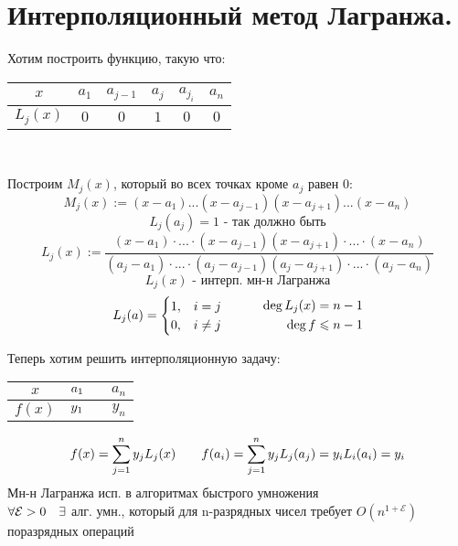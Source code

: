 \documentclass[algebra]{subfiles}
\begin{document}
    \section{Интерполяционный метод Лагранжа.}
      \begin{definition}
        Хотим построить функцию, такую что:
        \begin{center}
          \begin{tabular} {c | c | c c c | c}
            $x$    & $a_1$ & $a_{j - 1} $ & $ a_j$ & $a_{j_i}$ & $a_n$ \\
            \hline
            $L_j(x)$ & $0$   & $0$          & $1$    & $0$       & $0$
          \end{tabular}\\
        \end{center}

        Построим $M_j(x)$, который во всех точках кроме $a_j$ равен 0:
        \[M_j(x) := (x - a_1) ... (x - a_{j - 1}) (x - a_{j + 1})...(x - a_n)\]
        \[L_j(a_j) = 1 \text{ - так должно быть}\]
        \[L_j(x) := \frac{(x - a_1) \cdot ... \cdot (x - a_{j - 1})(x - a_{j + 1}) \cdot ... \cdot (x - a_n)}
          {(a_j - a_1) \cdot ... \cdot (a_j - a_{j - 1})(a_j - a_{j + 1}) \cdot ... \cdot (a_j - a_n)}\]
          \[L_j(x) \text{ - интерп. мн-н Лагранжа}\]
          \[L_j(a) =
            \begin{cases}
              1, & i = j    \\
              0, & i \neq j
            \end{cases}
            \quad\quad\quad
            \begin{align}
              \deg L_j(x) = n - 1 \\
              \deg f \leqslant n - 1
            \end{align}
          \]

          Теперь хотим решить интерполяционную задачу:
          \begin{center}
            \begin{tabular} {c | c  c}
              $x$    & $a_1 \quad$ & $a_n$ \\
              \hline
              $f(x)$ & $y_1 \quad$ & $y_n$
            \end{tabular}
          \end{center}
          \[f(x) = \sum_{j = 1}^n y_j L_j (x) \quad\quad f(a_i) = \sum_{j = 1}^n y_j L_j (a_j) = y_i L_i (a_i) = y_i\]
          Мн-н Лагранжа исп. в алгоритмах быстрого умножения\\
          $\forall \mathcal{E} > 0 \quad \exists $ алг. умн., который для n-разрядных чисел требует $O(n^{1 + \mathcal{E}})$
          поразрядных операций
          \end{definition}
\end{document}

